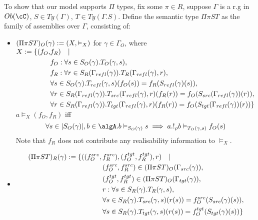 \documentclass[12pt,a4paper]{article}
\def\src{_{src}}\alwaysmath{src}
\def\rfl{_{refl}}\alwaysmath{rfl}
\def\tgt{_{tgt}}\alwaysmath{tgt}
\renewcommand{\O}{_{O}}
\newcommand{\R}{\ensuremath{_{R}}}
\begin{document}
To show that our model supports $\Pi$ types, fix some $\pi \in R$, suppose $\Gamma$ is a r.g in $\ob\cC$, $S \in Ty(\Gamma)$, $T \in Ty(\Gamma.S)$. 
Define the semantic type $\Pi \pi S T$ as the family of assemblies over $\Gamma$, consisting of:

\begin{itemize}
  \item $(\Pi \pi S T)\O(\gamma) \define (X, \vDash_X)$ for $\gamma \in \Gamma\O$, where
    \subitem
        $\begin{aligned}
          X \define \{ (f\O,& f\R) \quad | \quad \\ 
          & f\O : \forall s \in S\O(\gamma).T\O(\gamma, s),\\
          & f\R : \forall r \in S\R(\Gamma\rfl(\gamma)). T\R(\Gamma\rfl(\gamma), r),\\
          & \forall s \in S\O(\gamma). T\rfl(\gamma, s)(f\O (s)) = f\R(S\rfl(\gamma)(s)),\\
          & \forall r \in S\R(\Gamma\rfl(\gamma)). T\src(\Gamma\rfl(\gamma),r)(f\R (r)) = f\O(S\src(\Gamma\rfl(\gamma))(r)),\\
          & \forall r \in S\R(\Gamma\rfl(\gamma)). T\tgt(\Gamma\rfl(\gamma),r)(f\R (r)) = f\O(S\tgt(\Gamma\rfl(\gamma))(r))  \}
        \end{aligned}$\\
    
    \subitem $a \vDash_X (f\O, f\R)$ iff
    $$\forall s \in \carr{S\O(\gamma)}, b \in \algA . b \vDash_{S\O(\gamma)} s \implies a . !_\rho b \vDash_{T\O(\gamma,s)} f\O(s)$$
    Note that $f\R$ does not contribute any realisability information to $\vDash_X$.
    
    \item
     \begin{align*}
           (\Pi \pi S T)\R(\gamma)  \define \{( (f\O^{src}, \,& f\R^{src}), (f\O^{tgt}, f\R^{tgt}), r)  \quad|\quad \\
            & (f\O^{src},f\R^{src}) \in (\Pi\pi S T)\O(\Gamma\src(\gamma)),\\
            & (f\O^{tgt},f\R^{tgt}) \in (\Pi\pi S T)\O(\Gamma\tgt(\gamma)),\\
            & r : \forall s \in S\R(\gamma). T\R(\gamma, s),\\     
            & \forall s \in S\R(\gamma). T\src(\gamma, s)( r (s)) = f\O^{src}(S\src(\gamma)(s)),\\
            & \forall s \in S\R(\gamma). T\tgt(\gamma, s)( r (s)) = f\O^{tgt}(S\tgt(\gamma)(s)) \}
      \end{align*}
%    
%     


\end{itemize}
\end{document}
